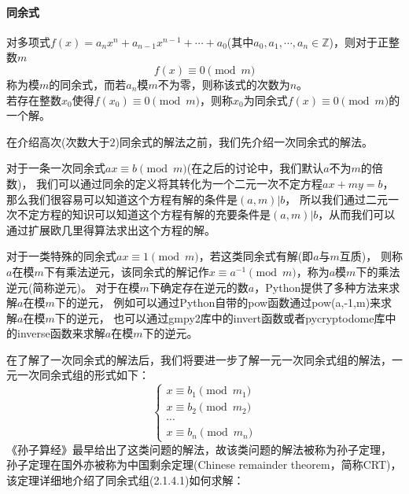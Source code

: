 \documentclass{article}
\numberwithin{equation}{subsubsection}
\begin{document}
\paragraph{\textbf{同余式}}
对多项式$f(x)=a_nx^n+a_{n-1}x^{n-1}+\cdots+a_0$(其中$a_0,a_1,\cdots,a_n\in\mathbb{Z}$)，则对于正整数$m$
\begin{equation}
    f(x)\equiv 0\pmod{m}
    \nonumber
\end{equation}
称为模$m$的同余式，而若$a_n$模$m$不为零，则称该式的次数为$n$。\\
若存在整数$x_0$使得$f(x_0)\equiv 0\pmod{m}$，则称$x_0$为同余式$f(x)\equiv 0\pmod{m}$的一个解。\par
在介绍高次(次数大于$2$)同余式的解法之前，我们先介绍一次同余式的解法。\par
对于一条一次同余式$ax\equiv b\pmod{m}$(在之后的讨论中，我们默认$a$不为$m$的倍数)，
我们可以通过同余的定义将其转化为一个二元一次不定方程$ax+my=b$，那么我们很容易可以知道这个方程有解的条件是$(a,m)|b$，
所以我们通过二元一次不定方程的知识可以知道这个方程有解的充要条件是$(a,m)|b$，从而我们可以通过扩展欧几里得算法求出这个方程的解。\par
对于一类特殊的同余式$ax\equiv 1\pmod{m}$，若这类同余式有解(即$a$与$m$互质)，
则称$a$在模$m$下有乘法逆元，该同余式的解记作$x\equiv a^{-1}\pmod{m}$，称为$a$模$m$下的乘法逆元(简称逆元)。
对于在模$m$下确定存在逆元的数$a$，Python提供了多种方法来求解$a$在模$m$下的逆元，
例如可以通过Python自带的pow函数通过pow(a,-1,m)来求解$a$在模$m$下的逆元，
也可以通过gmpy2库中的invert函数或者pycryptodome库中的inverse函数来求解$a$在模$m$下的逆元。\par
在了解了一次同余式的解法后，我们将要进一步了解一元一次同余式组的解法，一元一次同余式组的形式如下：
\begin{equation}
    \begin{cases}
        x\equiv b_1\pmod{m_1}\\
        x\equiv b_2\pmod{m_2}\\
        \cdots\\
        x\equiv b_n\pmod{m_n}
    \end{cases}
\end{equation}
《孙子算经》最早给出了这类问题的解法，故该类问题的解法被称为孙子定理，
孙子定理在国外亦被称为中国剩余定理(Chinese remainder theorem，简称CRT)，
该定理详细地介绍了同余式组(2.1.4.1)如何求解：
\end{document}
